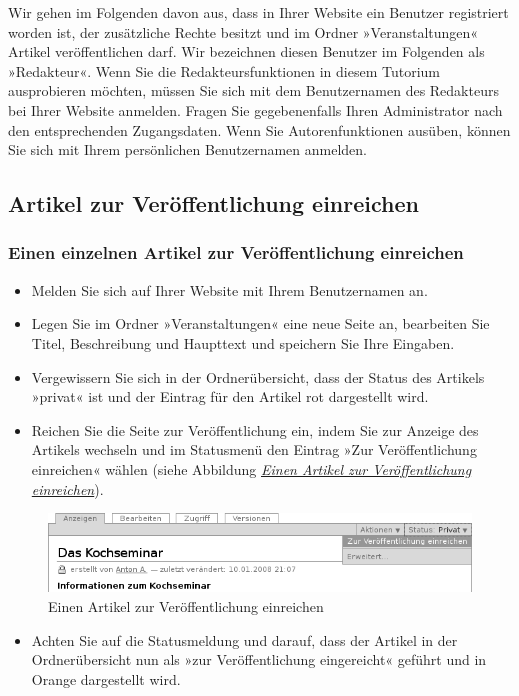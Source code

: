 \documentclass[a4paper,12pt,ngerman]{manual}
\begin{document}
Wir gehen im Folgenden davon aus, dass in Ihrer Website ein Benutzer
registriert worden ist, der zusätzliche Rechte besitzt und im Ordner
»Veranstaltungen« Artikel veröffentlichen darf. Wir bezeichnen diesen Benutzer
im Folgenden als »Redakteur«. Wenn Sie die Redakteursfunktionen in diesem
Tutorium ausprobieren möchten, müssen Sie sich mit dem Benutzernamen des
Redakteurs bei Ihrer Website anmelden. Fragen Sie gegebenenfalls Ihren
Administrator nach den entsprechenden Zugangsdaten. Wenn Sie Autorenfunktionen
ausüben, können Sie sich mit Ihrem persönlichen Benutzernamen anmelden.
\hypertarget{sec-artik-zur-veroff}{}

\subsection{Artikel zur Veröffentlichung einreichen}


\hypertarget{sec-veroff-von-artik-2}{}\subsubsection{Einen einzelnen Artikel zur Veröffentlichung einreichen}
\begin{itemize}
\item {} 
Melden Sie sich auf Ihrer Website mit Ihrem Benutzernamen an.

\item {} 
Legen Sie im Ordner »Veranstaltungen« eine neue Seite an, bearbeiten Sie
Titel, Beschreibung und Haupttext und speichern Sie Ihre Eingaben.

\item {} 
Vergewissern Sie sich in der Ordnerübersicht, dass der Status des
Artikels »privat« ist und der Eintrag für den Artikel rot dargestellt
wird.

\item {} 
Reichen Sie die Seite zur Veröffentlichung ein, indem Sie zur Anzeige
des Artikels wechseln und im Statusmenü den Eintrag »Zur Veröffentlichung
einreichen« wählen (siehe
Abbildung \hyperlink{fig-auswahlmenu-zur-veroeffentlichung-einreichen}{\emph{Einen Artikel zur Veröffentlichung einreichen}}).

\end{itemize}
\hypertarget{fig-auswahlmenu-zur-veroeffentlichung-einreichen}{}\begin{figure}[htbp]
\centering

\includegraphics{zur-veroeffentlichung-einreichen.png}
\caption{Einen Artikel zur Veröffentlichung einreichen}\end{figure}
\begin{itemize}
\item {} 
Achten Sie auf die Statusmeldung und darauf, dass der Artikel in der
Ordnerübersicht nun als »zur Veröffentlichung eingereicht« geführt und in
Orange dargestellt wird.

\end{itemize}
\hypertarget{sec-veroff-von-artik-4}{}
\end{document}
